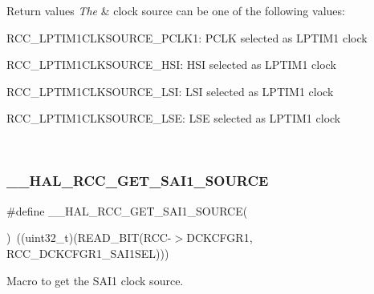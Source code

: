 \begin{DoxyRetVals}{Return values}
{\em The} & clock source can be one of the following values\+: \begin{DoxyItemize}
\item R\+C\+C\+\_\+\+L\+P\+T\+I\+M1\+C\+L\+K\+S\+O\+U\+R\+C\+E\+\_\+\+P\+C\+L\+K1\+: P\+C\+LK selected as L\+P\+T\+I\+M1 clock \item R\+C\+C\+\_\+\+L\+P\+T\+I\+M1\+C\+L\+K\+S\+O\+U\+R\+C\+E\+\_\+\+H\+SI\+: H\+SI selected as L\+P\+T\+I\+M1 clock \item R\+C\+C\+\_\+\+L\+P\+T\+I\+M1\+C\+L\+K\+S\+O\+U\+R\+C\+E\+\_\+\+L\+SI\+: L\+SI selected as L\+P\+T\+I\+M1 clock \item R\+C\+C\+\_\+\+L\+P\+T\+I\+M1\+C\+L\+K\+S\+O\+U\+R\+C\+E\+\_\+\+L\+SE\+: L\+SE selected as L\+P\+T\+I\+M1 clock \end{DoxyItemize}
\\
\hline
\end{DoxyRetVals}
\mbox{\label{group___r_c_c_ex___exported___macros_ga9af45dae7c2f2f1c8848be68d7bded7e}} 
\subsubsection{\texorpdfstring{\_\_HAL\_RCC\_GET\_SAI1\_SOURCE}{\_\_HAL\_RCC\_GET\_SAI1\_SOURCE}}
{\footnotesize\ttfamily \#define \+\_\+\+\_\+\+H\+A\+L\+\_\+\+R\+C\+C\+\_\+\+G\+E\+T\+\_\+\+S\+A\+I1\+\_\+\+S\+O\+U\+R\+CE(\begin{DoxyParamCaption}{ }\end{DoxyParamCaption})~((uint32\+\_\+t)(R\+E\+A\+D\+\_\+\+B\+IT(R\+CC-\/$>$D\+C\+K\+C\+F\+G\+R1, R\+C\+C\+\_\+\+D\+C\+K\+C\+F\+G\+R1\+\_\+\+S\+A\+I1\+S\+EL)))}



Macro to get the S\+A\+I1 clock source. 


